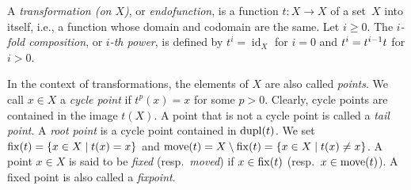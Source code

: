 
\label{def:identity_transformation}
A \emph{transformation (on $X$)}, or \emph{endofunction}, 
is a function $t \colon X \to X$ of a set~$X$
into itself, i.e., a function whose domain and codomain are the same. 
Let $i \ge 0$. The \emph{$i$-fold composition}, or \emph{$i$-th power},
is defined by $t^i = \operatorname{id}_X$ for $i = 0$ 
and $t^{i} = \concat{t}{t^{i-1}}$ for $i > 0$. 

\label{def:fixmove}

In the context of transformations, the elements of $X$ are also called \emph{points}.
We call $x \in X$ a \emph{cycle point} if $t^p(x) = x$ for some $p > 0$.
Clearly, cycle points are contained in the image $t(X)$.
A point that is not a cycle point is called a \emph{tail point}.
A \emph{root point} is a cycle point contained in $\dupl{t}$.
We set $\fix{t} = \{ x \in X \mid t(x) = x\}$
and $\move{t} = X \setminus \fix{t} = \{x \in X \mid t(x) \ne x \}$.
A point $x \in X$ is said to be \emph{fixed} (resp.~\emph{moved})
if $x \in \fix{t}$ (resp.~$x \in \move{t}$).
A fixed point is also called a \emph{fixpoint}.

